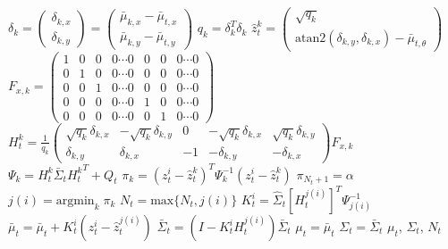 \documentclass[conference]{IEEEtran}
\begin{document}
\begin{algorithm}[htbp]
\begin{algorithmic}[1]
				\State $\delta_{k} = \begin{pmatrix} \delta_{k,x} \\ \delta_{k,y} \end{pmatrix} = \begin{pmatrix} \bar{\mu}_{k,x}-\bar{\mu}_{t,x} \\ \bar{\mu}_{k,y}-\bar{\mu}_{t,y} \end{pmatrix}$
				\State $q_{k} = \delta_{k}^{T}\delta_{k}$
				\State $\hat{z}_{t}^{k} = \begin{pmatrix} \sqrt{q_{k}} \\ \mathrm{atan2}(\delta_{k,y},\delta_{k,x})-\bar{\mu}_{t,\theta} \end{pmatrix}$
				\State $F_{x,k} = \begin{pmatrix} 1 & 0 & 0 & 0 \cdots 0 & 0 & 0 & 0 \cdots 0 \\ 0 & 1 & 0 & 0 \cdots 0 & 0 & 0 & 0 \cdots 0 \\ 0 & 0 & 1 & 0 \cdots 0 & 0 & 0 & 0 \cdots 0 \\ 0 & 0 & 0 & 0 \cdots 0 & 1 & 0 & 0 \cdots 0 \\ 0 & 0 & 0 & 0 \cdots 0 & 0 & 1 & 0 \cdots 0 \end{pmatrix}$
				{\tiny\State $H_{t}^{k} = \frac{1}{q_{k}} \begin{pmatrix} \sqrt{q_{k}}\delta_{k,x} & -\sqrt{q_{k}}\delta_{k,y} & 0 & -\sqrt{q_{k}}\delta_{k,x} & \sqrt{q_{k}}\delta_{k,y} \\ \delta_{k,y} & \delta_{k,x} & -1 & -\delta_{k,y} & -\delta_{k,x}  \end{pmatrix} F_{x,k}$}
				\State $\Psi_{k} = H_{t}^{k}\bar{\Sigma}_{t}{H_{t}^{k}}^{T} + Q_{t}$
				\State $\pi_{k} = (z_{t}^{i}-\hat{z}_{t}^{k})^{T} \Psi_{k}^{-1} (z_{t}^{i}-\hat{z}_{t}^{k})$
			\EndFor
			\State $\pi_{N_{t}+1} = \alpha$
			\State $j(i) = \mathrm{argmin}_{k} \; \pi_{k}$
			\State $N_{t} = \mathrm{max}\{N_{t},j(i)\}$
			\State $K_{t}^{i} = \hat{\Sigma}_{t}[{H_{t}^{j(i)}}]^{T}\Psi_{j(i)}^{-1}$
			\State $\bar{\mu}_{t} = \bar{\mu}_{t} + K_{t}^{i}(z_{t}^{i} - \hat{z}_{t}^{j(i)})$
			\State $\bar{\Sigma}_{t} = (I-K_{t}^{i}H_{t}^{j(i)})\bar{\Sigma}_{t}$
		\EndFor
		\State $\mu_{t} = \bar{\mu}_{t}$
		\State $\Sigma_{t} = \bar{\Sigma}_{t}$
		\Ensure $\mu_{t}$, $\Sigma_{t}$, $N_{t}$
	\end{algorithmic}
\end{algorithm}
\end{document}
